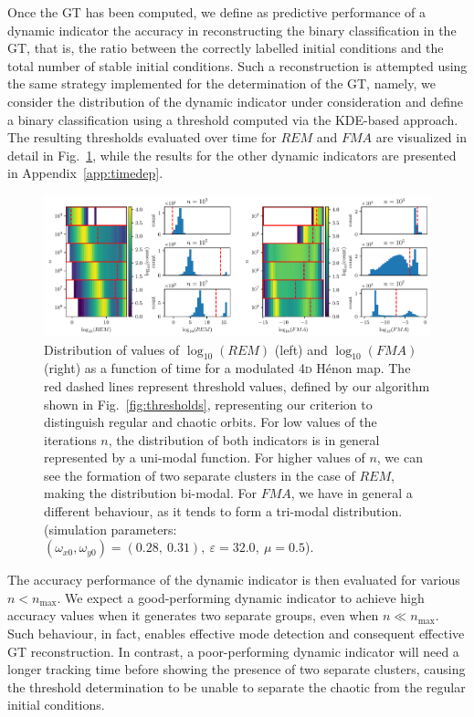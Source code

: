 Once the GT has been computed, we define as predictive performance of a dynamic indicator the accuracy in reconstructing the binary classification in the GT, that is, the ratio between the correctly labelled initial conditions and the total number of stable initial conditions. Such a reconstruction is attempted using the same strategy implemented for the determination of the GT, namely, we consider the distribution of the dynamic indicator under consideration and define a binary classification using a threshold computed via the KDE-based approach. The resulting thresholds evaluated over time for $REM$ and $FMA$ are visualized in detail in Fig.~\ref{fig:neo_evolution}, while the results for the other dynamic indicators are presented in Appendix~\ref{app:timedep}.

\begin{figure}[htp]
    \centering
    \includegraphics[width=1.0\textwidth]{6_dynamic_indicators/fig/corrected_figs/neo_evolution_idx_3.pdf}
    \caption{Distribution of values of $\log_{10}(REM)$ (left) and $\log_{10}(FMA)$ (right) as a function of time for a modulated 4\textsc{d} Hénon map. The red dashed lines represent threshold values, defined by our algorithm shown in Fig.~\ref{fig:thresholds}, representing our criterion to distinguish regular and chaotic orbits.
    For low values of the iterations $n$, the distribution of both indicators is in general represented by a uni-modal function. For higher values of $n$, we can see the formation of two separate clusters in the case of $REM$, making the distribution bi-modal. For $FMA$, we have in general a different behaviour, as it tends to form a tri-modal distribution. (simulation parameters: $(\omega_{x0},\omega_{y0})= (0.28,\ 0.31),\ \varepsilon=32.0,\ \mu=0.5$).}
    \label{fig:neo_evolution}
\end{figure}

The accuracy performance of the dynamic indicator is then evaluated for various $n < n_{\text{max}}$. We expect a good-performing dynamic indicator to achieve high accuracy values when it generates two separate groups, even when $n \ll n_{\text{max}}$. Such behaviour, in fact, enables effective mode detection and consequent effective GT reconstruction. In contrast, a poor-performing dynamic indicator will need a longer tracking time before showing the presence of two separate clusters, causing the threshold determination to be unable to separate the chaotic from the regular initial conditions.

